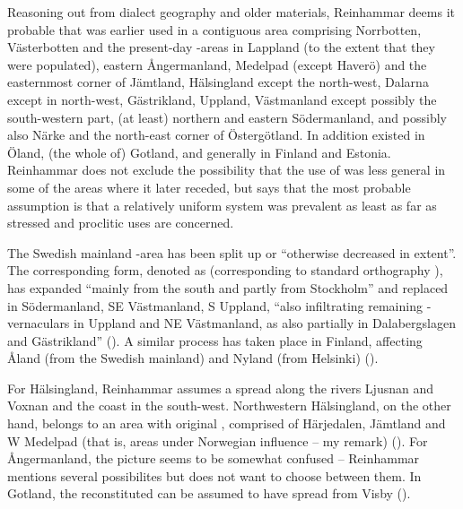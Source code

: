Reasoning out from dialect geography and older materials, Reinhammar deems it probable that  was earlier used in a contiguous area comprising Norrbotten, Västerbotten and the present-day -areas in Lappland (to the extent that they were populated), eastern Ångermanland, Medelpad (except Haverö) and the easternmost corner of Jämtland, Hälsingland except the north-west, Dalarna except in north-west, Gästrikland, Uppland, Västmanland except possibly the south-western part, (at least) northern and eastern Södermanland, and possibly also Närke and the north-east corner of Östergötland. In addition  existed in Öland, (the whole of) Gotland, and generally in Finland and Estonia. Reinhammar does not exclude the possibility that the use of  was less general in some of the areas where it later receded, but says that the most probable assumption is that a relatively uniform system was prevalent as least as far as stressed and proclitic uses are concerned.

The Swedish mainland -area has been split up or “otherwise decreased in extent”. The corresponding form, denoted as  (corresponding to standard orthography ), has expanded “mainly from the south and partly from Stockholm” and replaced  in Södermanland, SE Västmanland, S Uppland, “also infiltrating remaining -vernaculars in Uppland and NE Västmanland, as also partially in Dalabergslagen and Gästrikland” (\citealt[186]{Reinhammar1975}). A similar process has taken place in Finland, affecting Åland (from the Swedish mainland) and Nyland (from Helsinki) (\citealt[187]{Reinhammar1975}).

For Hälsingland, Reinhammar assumes a spread along the rivers Ljusnan and Voxnan and the coast in the south-west. Northwestern Hälsingland, on the other hand, belongs to an area with original , comprised of Härjedalen, Jämtland and W Medelpad (that is, areas under Norwegian influence – my remark) (\citealt[186]{Reinhammar1975}). For Ångermanland, the picture seems to be somewhat confused – Reinhammar mentions several possibilites but does not want to choose between them. In Gotland, the reconstituted  can be assumed to have spread from Visby (\citealt[188]{Reinhammar1975}). 

